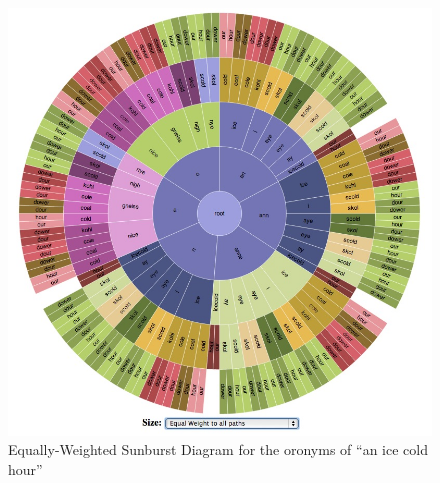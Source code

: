 \begin{figure}
\includegraphics[width=150mm]{aNiceColdHour_UNISYN_FreqMetric_EqualWeight.jpg}
\captionfonts
\caption[Equally-Weighted Sunburst Diagram for the oronyms of ``an ice cold hour'']{Equally-Weighted Sunburst Diagram for the oronyms of ``an ice cold hour''}
\label{fig:oronymsunburst:anicecoldhourEqualWeight}
\end{figure}


